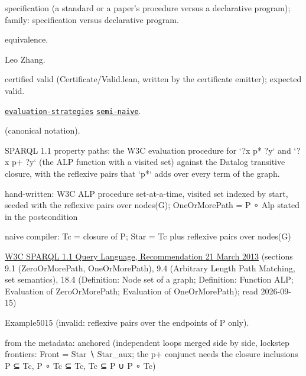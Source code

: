 \documentclass[10pt]{article}
\begin{document}
\begin{description}[leftmargin=2.6cm,style=nextline,itemsep=1pt]

\item[Category] specification (a standard or a paper's procedure versus a declarative program); family: specification versus declarative program.

\item[Kind] equivalence.

\item[Contributors] Leo Zhang.

\item[Status] certified valid (Certificate/Valid.lean, written by the certificate emitter); expected valid.

\item[Tags] \hyperref[tag:evaluation-strategies]{\texttt{evaluation-strategies}} \hyperref[tag:semi-naive]{\texttt{semi-naive}}.

\item[Input]  (canonical notation).

\item[Summary] SPARQL 1.1 property paths: the W3C evaluation procedure for `?x p* ?y` and `?x p+ ?y` (the ALP function with a visited set) against the Datalog transitive closure, with the reflexive pairs that `p*` adds over every term of the graph.

\item[Sides] hand-written: W3C ALP procedure set-at-a-time, visited set indexed by start, seeded with the reflexive pairs over nodes(G); OneOrMorePath = P ∘ Alp stated in the postcondition \par naive compiler: Tc = closure of P; Star = Tc plus reflexive pairs over nodes(G)

\item[Sources] {\raggedright \href{https://www.w3.org/TR/sparql11-query/}{W3C SPARQL 1.1 Query Language, Recommendation 21 March 2013} (sections 9.1 (ZeroOrMorePath, OneOrMorePath), 9.4 (Arbitrary Length Path Matching, set semantics), 18.4 (Definition: Node set of a graph; Definition: Function ALP; Evaluation of ZeroOrMorePath; Evaluation of OneOrMorePath); read 2026-09-15)\par}

\item[Twin] Example5015 (invalid: reflexive pairs over the endpoints of P only).

\item[Obstruction note] from the metadata: anchored (independent loops merged side by side, lockstep frontiers: Front = Star ∖ Star\_aux; the p+ conjunct needs the closure inclusions P ⊆ Tc, P ∘ Tc ⊆ Tc, Tc ⊆ P ∪ P ∘ Tc)

\end{description}
\end{document}
